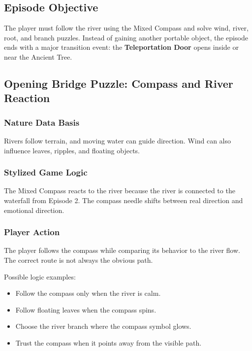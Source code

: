 \documentclass[12pt]{article}
\begin{document}
\subsection{Episode Objective}

The player must follow the river using the Mixed Compass and solve wind, river, root, and branch puzzles. Instead of gaining another portable object, the episode ends with a major transition event: the \textbf{Teleportation Door} opens inside or near the Ancient Tree.

\subsection{Opening Bridge Puzzle: Compass and River Reaction}

\subsubsection{Nature Data Basis}

Rivers follow terrain, and moving water can guide direction. Wind can also influence leaves, ripples, and floating objects.

\subsubsection{Stylized Game Logic}

The Mixed Compass reacts to the river because the river is connected to the waterfall from Episode 2. The compass needle shifts between real direction and emotional direction.

\subsubsection{Player Action}

The player follows the compass while comparing its behavior to the river flow. The correct route is not always the obvious path.

Possible logic examples:

\begin{itemize}[leftmargin=*]
    \item Follow the compass only when the river is calm.
    \item Follow floating leaves when the compass spins.
    \item Choose the river branch where the compass symbol glows.
    \item Trust the compass when it points away from the visible path.
\end{itemize}
\end{document}
